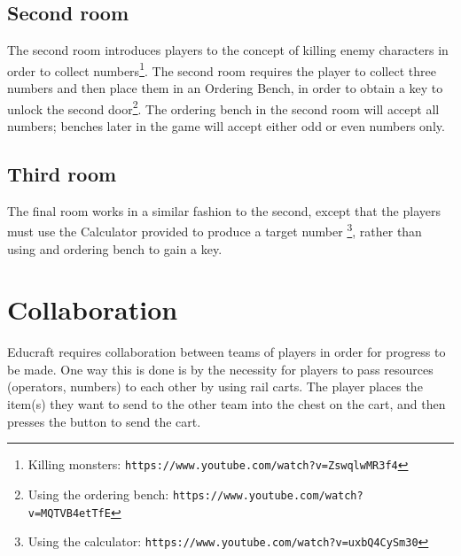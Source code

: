 \subsection{Second room}
The second room introduces players to the concept of killing enemy characters
in order to collect numbers\footnote{Killing monsters: \texttt{https://www.youtube.com/watch?v=ZswqlwMR3f4}}.
The second room requires the player to collect three numbers and then place them in
an Ordering Bench, in order to obtain a key to unlock the second
door\footnote{Using the ordering bench: \texttt{https://www.youtube.com/watch?v=MQTVB4etTfE}}.
The ordering bench in the second room will accept all numbers; benches later in the game
will accept either odd or even numbers only.

\subsection{Third room}
The final room works in a similar fashion to the second, except that the players
must use the Calculator provided to produce a target number
\footnote{Using the calculator: \texttt{https://www.youtube.com/watch?v=uxbQ4CySm30}},
rather than using and ordering bench to gain a key.


\section{Collaboration}
Educraft requires collaboration between teams of players in order for progress to be made.
One way this is done is by the necessity for players to pass resources (operators, numbers)
to each other by using rail carts. The player places the item(s) they want to send to the other
team into the chest on the cart, and then presses the button to send the cart.

